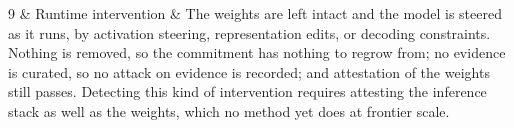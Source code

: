 \begin{longtable}
9 & Runtime intervention & The weights are left intact and the model is steered as it runs, by activation steering, representation edits, or decoding constraints. Nothing is removed, so the commitment has nothing to regrow from; no evidence is curated, so no attack on evidence is recorded; and attestation of the weights still passes. Detecting this kind of intervention requires attesting the inference stack as well as the weights, which no method yet does at frontier scale. \\ \hline
\end{longtable}
\endgroup
